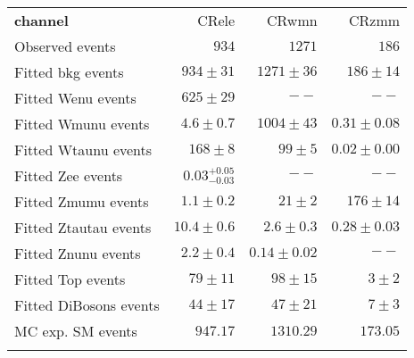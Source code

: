 

\begin{table}
\begin{center}
\setlength{\tabcolsep}{0.0pc}
{\small
\begin{tabular*}{\textwidth}{@{\extracolsep{\fill}}lrrr}
\noalign{\smallskip}\hline\noalign{\smallskip}
{\bf  channel}                         & CRele            & CRwmn            & CRzmm              \\[-0.05cm]
\noalign{\smallskip}\hline\noalign{\smallskip}
Observed events                        & $934$              & $1271$              & $186$                    \\
\noalign{\smallskip}\hline\noalign{\smallskip}
Fitted bkg events                     & $934 \pm 31$         & $1271 \pm 36$          & $186 \pm 14$              \\
\noalign{\smallskip}\hline\noalign{\smallskip}
        Fitted Wenu events         & $625 \pm 29$           & $--$                       & $--$              \\
        Fitted Wmunu events         & $4.6 \pm 0.7$          & $1004 \pm 43$              & $0.31 \pm 0.08$              \\
        Fitted Wtaunu events         & $168 \pm 8$           & $99 \pm 5$                & $0.02 \pm 0.00$              \\
        Fitted Zee events         & $0.03_{-0.03}^{+0.05}$          & $--$               & $--$              \\
        Fitted Zmumu events         & $1.1 \pm 0.2$          & $21 \pm 2$              & $176 \pm 14$              \\
        Fitted Ztautau events         & $10.4 \pm 0.6$          & $2.6 \pm 0.3$          & $0.28 \pm 0.03$              \\
        Fitted Znunu events         & $2.2 \pm 0.4$          & $0.14 \pm 0.02$          & $--$              \\
        Fitted Top events         & $79 \pm 11$              & $98 \pm 15$            & $3 \pm 2$              \\
        Fitted DiBosons events         & $44 \pm 17$          & $47 \pm 21$             & $7 \pm 3$              \\
 \noalign{\smallskip}\hline\noalign{\smallskip}
MC exp. SM events              & $947.17$          & $1310.29$          & $173.05$              \\
\noalign{\smallskip}\hline\noalign{\smallskip}

\end{tabular*}}
\end{center}
\end{table}
